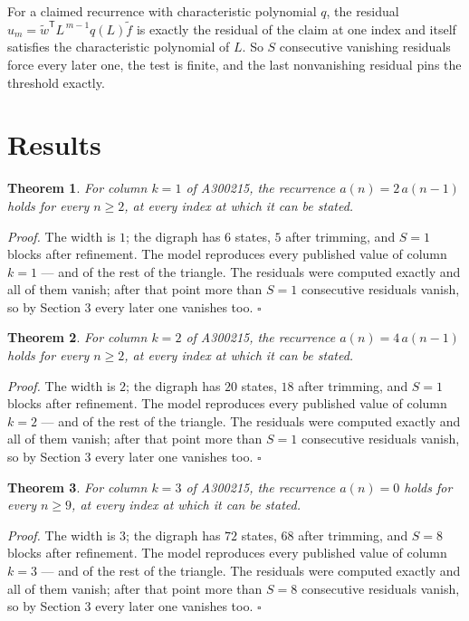 \documentclass[11pt]{article}
\newtheorem{theorem}{Theorem}
\theoremstyle{definition}
\begin{document}
For a claimed recurrence with characteristic polynomial $q$, the residual $u_m = \tilde w^{\mathsf T}L^{\,m-1}q(L)\tilde f$ is exactly the residual of the claim at one index and itself satisfies the characteristic polynomial of $L$. So $S$ consecutive vanishing residuals force every later one, the test is finite, and the last nonvanishing residual pins the threshold exactly.

\section{Results}

\begin{theorem} For column $k = 1$ of A300215, the recurrence $a(n) = 2\,a(n-1)$ holds for every $n \ge 2$, at every index at which it can be stated.\end{theorem}

{\itshape Proof.} The width is $1$; the digraph has $6$ states, $5$ after trimming, and $S = 1$ blocks after refinement. The model reproduces every published value of column $k = 1$ --- and of the rest of the triangle. The residuals were computed exactly and all of them vanish; after that point more than $S = 1$ consecutive residuals vanish, so by Section 3 every later one vanishes too. $\square$

\begin{theorem} For column $k = 2$ of A300215, the recurrence $a(n) = 4\,a(n-1)$ holds for every $n \ge 2$, at every index at which it can be stated.\end{theorem}

{\itshape Proof.} The width is $2$; the digraph has $20$ states, $18$ after trimming, and $S = 1$ blocks after refinement. The model reproduces every published value of column $k = 2$ --- and of the rest of the triangle. The residuals were computed exactly and all of them vanish; after that point more than $S = 1$ consecutive residuals vanish, so by Section 3 every later one vanishes too. $\square$

\begin{theorem} For column $k = 3$ of A300215, the recurrence $a(n) = 0$ holds for every $n \ge 9$, at every index at which it can be stated.\end{theorem}

{\itshape Proof.} The width is $3$; the digraph has $72$ states, $68$ after trimming, and $S = 8$ blocks after refinement. The model reproduces every published value of column $k = 3$ --- and of the rest of the triangle. The residuals were computed exactly and all of them vanish; after that point more than $S = 8$ consecutive residuals vanish, so by Section 3 every later one vanishes too. $\square$
\end{document}
